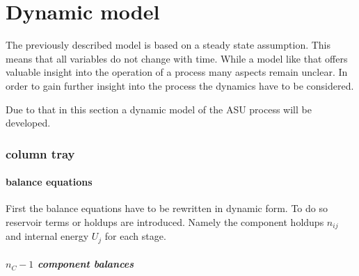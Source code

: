 \chapter{Dynamic model}
\label{chp:dynamics}    

    The previously described model is based on a steady state assumption. This means that all variables do not
    change with time. While a model like that offers valuable insight into the operation of a process many
    aspects remain unclear. In order to gain further insight into the process the dynamics have to be considered.

    Due to that in this section a dynamic model of the ASU process will be developed.

\subsection{column tray}
    \begin{figure}
        
    \end{figure}

\subsubsection{balance equations}
    First the balance equations have to be rewritten in dynamic form. To do so reservoir terms or holdups
    are introduced. Namely the component holdups $n_{ij}$ and internal energy $U_j$ for each stage.

    \paragraph{$n_C - 1$ component balances}
